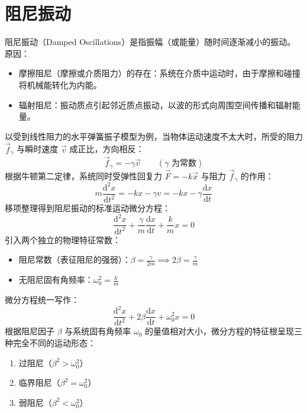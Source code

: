
\section{阻尼振动}
\begin{definition}[阻尼振动]
    阻尼振动（Damped Oscillations）是指振幅（或能量）随时间逐渐减小的振动。原因：
    \begin{itemize}
    \item 摩擦阻尼（摩擦或介质阻力）的存在：系统在介质中运动时，由于摩擦和碰撞将机械能转化为内能。
    \item 辐射阻尼：振动质点引起邻近质点振动，以波的形式向周围空间传播和辐射能量。
    \end{itemize}
    以受到线性阻力的水平弹簧振子模型为例，当物体运动速度不太大时，所受的阻力 $\vec{f}_\gamma$ 与瞬时速度 $\vec{v}$ 成正比，方向相反：
    $$\vec{f}_\gamma = -\gamma \vec{v} \qquad (\gamma \text{ 为常数})$$
    根据牛顿第二定律，系统同时受弹性回复力 $\vec{F} = -k\vec{x}$ 与阻力 $\vec{f}_\gamma$ 的作用：$$m \frac{\mathrm{d}^2x}{\mathrm{d}t^2} = -kx - \gamma v = -kx - \gamma \frac{\mathrm{d}x}{\mathrm{d}t}$$移项整理得到阻尼振动的标准运动微分方程：$$\frac{\mathrm{d}^2x}{\mathrm{d}t^2} + \frac{\gamma}{m} \frac{\mathrm{d}x}{\mathrm{d}t} + \frac{k}{m} x = 0$$引入两个独立的物理特征常数：
    \begin{itemize}
    \item 阻尼常数（表征阻尼的强弱）：$\beta = \frac{\gamma}{2m} \implies 2\beta = \frac{\gamma}{m}$
    \item 无阻尼固有角频率：$\omega_0^2 = \frac{k}{m}$
    \end{itemize}
    微分方程统一写作：\[\boxed{\frac{\mathrm{d}^2x}{\mathrm{d}t^2} + 2\beta \frac{\mathrm{d}x}{\mathrm{d}t} + \omega_0^2 x = 0}\]根据阻尼因子 $\beta$ 与系统固有角频率 $\omega_0$ 的量值相对大小，微分方程的特征根呈现三种完全不同的运动形态：
    \begin{enumerate}
    \item 过阻尼（$\beta^2 > \omega_0^2$）
    \item 临界阻尼（$\beta^2 = \omega_0^2$）
    \item 弱阻尼（$\beta^2 < \omega_0^2$）
    \end{enumerate}
\end{definition}

